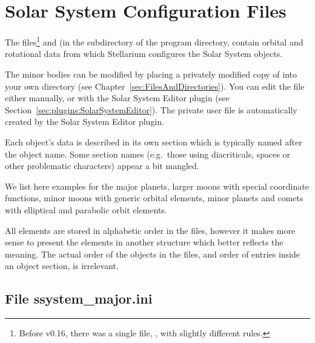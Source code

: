 

\section{Solar System Configuration Files}
\label{sec:ssystem.ini}

The files\footnote{Before v0.16, there was a single file, , with slightly different rules.}
  and    
(in the  subdirectory of the program directory, 
contain orbital and rotational data from which Stellarium configures the Solar
System objects. 

The minor bodies can be modified by placing a privately modified 
copy of  into your own
 directory (see Chapter~\ref{sec:FilesAndDirectories}). 
You can edit the file either manually, or with the Solar System Editor plugin (see
Section~\ref{sec:plugins:SolarSystemEditor}). The private user file is automatically created by the Solar System Editor plugin.



Each object's data is described in its own section which is typically
named after the object name. Some section names (e.g.\ those using
diacriticals, spaces or other problematic characters) appear a bit mangled.

We list here examples for the major planets, larger moons with special
coordinate functions, minor moons with generic orbital elements, minor
planets and comets with elliptical and parabolic orbit elements.

All elements are stored in alphabetic order in the files, however it
makes more sense to present the elements in another structure which
better reflects the meaning. The actual order of the objects in the files, 
and order of entries inside an object section, is irrelevant.

\subsection{File ssystem\_major.ini}
\label{sec:ssystem.ini:major}



